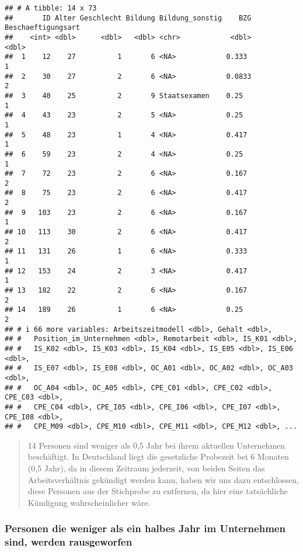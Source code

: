 \documentclass[
]{article}
\begin{document}
\begin{verbatim}
## # A tibble: 14 x 73
##       ID Alter Geschlecht Bildung Bildung_sonstig    BZG Beschaeftigungsart
##    <int> <dbl>      <dbl>   <dbl> <chr>            <dbl>              <dbl>
##  1    12    27          1       6 <NA>            0.333                   1
##  2    30    27          2       6 <NA>            0.0833                  2
##  3    40    25          2       9 Staatsexamen    0.25                    1
##  4    43    23          2       5 <NA>            0.25                    1
##  5    48    23          1       4 <NA>            0.417                   1
##  6    59    23          2       4 <NA>            0.25                    1
##  7    72    23          2       6 <NA>            0.167                   2
##  8    75    23          2       6 <NA>            0.417                   2
##  9   103    23          2       6 <NA>            0.167                   1
## 10   113    30          2       6 <NA>            0.417                   2
## 11   131    26          1       6 <NA>            0.333                   1
## 12   153    24          2       3 <NA>            0.417                   1
## 13   182    22          2       6 <NA>            0.167                   2
## 14   189    26          1       6 <NA>            0.25                    2
## # i 66 more variables: Arbeitszeitmodell <dbl>, Gehalt <dbl>,
## #   Position_im_Unternehmen <dbl>, Remotarbeit <dbl>, IS_K01 <dbl>,
## #   IS_K02 <dbl>, IS_K03 <dbl>, IS_K04 <dbl>, IS_E05 <dbl>, IS_E06 <dbl>,
## #   IS_E07 <dbl>, IS_E08 <dbl>, OC_A01 <dbl>, OC_A02 <dbl>, OC_A03 <dbl>,
## #   OC_A04 <dbl>, OC_A05 <dbl>, CPE_C01 <dbl>, CPE_C02 <dbl>, CPE_C03 <dbl>,
## #   CPE_C04 <dbl>, CPE_I05 <dbl>, CPE_I06 <dbl>, CPE_I07 <dbl>, CPE_I08 <dbl>,
## #   CPE_M09 <dbl>, CPE_M10 <dbl>, CPE_M11 <dbl>, CPE_M12 <dbl>, ...
\end{verbatim}

\begin{quote}
14 Personen sind weniger als 0,5 Jahr bei ihrem aktuellen Unternehmen
beschäftigt. In Deutschland liegt die gesetzliche Probezeit bei 6
Monaten (0,5 Jahr), da in diesem Zeitraum jederzeit, von beiden Seiten
das Arbeitsverhältnis gekündigt werden kann, haben wir uns dazu
entschlossen, diese Personen aus der Stichprobe zu entfernen, da hier
eine tatsächliche Kündigung wahrscheinlicher wäre.
\end{quote}

\subsubsection{Personen die weniger als ein halbes Jahr im Unternehmen
sind, werden
rausgeworfen}\label{personen-die-weniger-als-ein-halbes-jahr-im-unternehmen-sind-werden-rausgeworfen}
\end{document}
